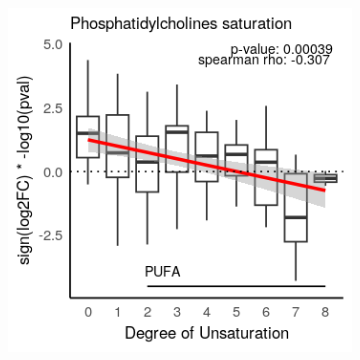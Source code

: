 \begin{figure}[ht]
\begin{subfigure}[t]{.2\textwidth}
        \includegraphics[width=\textwidth]{./main_plots/pc_saturation.png}        
    \end{subfigure} 

\end{figure}
